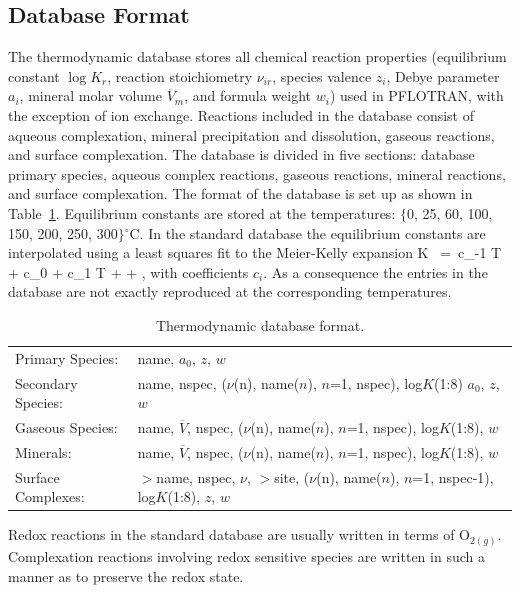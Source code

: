 \documentclass[12pt]{article}
\def\EQ#1\EN{\begin{equation}#1\end{equation}}
\newcommand{\eq}{\ =\ }
\newcommand{\degc}{$^\circ$C}
\begin{document}
\subsection{Database Format}

The thermodynamic database stores all chemical reaction properties (equilibrium constant $\log K_r$, reaction stoichiometry $\nu_{ir}$, species valence $z_i$, Debye parameter $a_i$, mineral molar volume $\overline V_m$, and formula weight $w_i$) used in PFLOTRAN, with the exception of ion exchange. Reactions included in the database consist of aqueous complexation, mineral precipitation and dissolution, gaseous reactions, and surface complexation. The database is divided in five sections: database primary species, aqueous complex reactions, gaseous reactions, mineral reactions, and surface complexation. The format of the database is set up as shown in Table~\ref{tdatabase}. Equilibrium constants are stored at the temperatures: $\{$0, 25, 60, 100, 150, 200, 250, 300$\}$\degc. In the standard database the equilibrium constants are interpolated using a least squares fit to the Meier-Kelly expansion
\EQ
\log K \eq c_{-1} \ln T + c_0 + c_1 T +  + ,
\EN
with coefficients $c_i$. As a consequence the entries in the database are not exactly reproduced at the corresponding temperatures. 

\begin{table}[h]\centering
\caption{Thermodynamic database format.}\label{tdatabase}
\vspace{3mm}
\begin{tabular}{ll}
\hline
Primary Species: & name, $a_0$, $z$, $w$\\
Secondary Species: & name, nspec, ($\nu$(n), name($n$), $n$=1, nspec), log$K$(1:8) $a_0$, $z$, $w$\\
Gaseous Species: & name, $\overline V$, nspec, ($\nu$(n), name($n$), $n$=1, nspec), log$K$(1:8), $w$ \\
Minerals: & name, $\overline V$, nspec, ($\nu$(n), name($n$), $n$=1, nspec), log$K$(1:8), $w$\\
Surface Complexes: & $>$name, nspec, $\nu$, $>$site, 
($\nu$(n), name($n$), $n$=1, nspec-1), log$K$(1:8), $z$, $w$\\
\hline
\end{tabular}
\end{table}

Redox reactions in the standard database are usually written in terms of O$_{2(g)}$.
Complexation reactions involving redox sensitive species are written in such a manner as to preserve the redox state.
\end{document}
